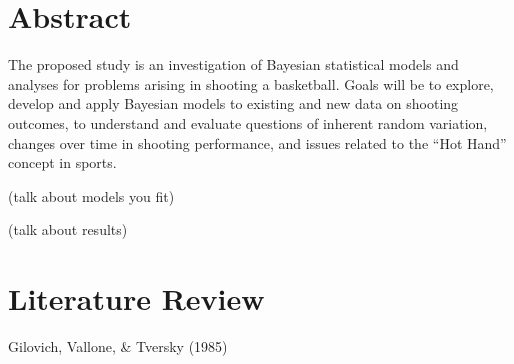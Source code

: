 \documentclass[12pt,twoside]{dukestatscithesis}
\theoremstyle{definition}
\theoremstyle{definition}
\theoremstyle{definition}
\theoremstyle{remark}
\begin{document}
\chapter{Abstract}\label{abstract}

The proposed study is an investigation of Bayesian statistical models
and analyses for problems arising in shooting a basketball. Goals will
be to explore, develop and apply Bayesian models to existing and new
data on shooting outcomes, to understand and evaluate questions of
inherent random variation, changes over time in shooting performance,
and issues related to the ``Hot Hand'' concept in sports.

\par

(talk about models you fit)

\par

(talk about results)

\chapter{Literature Review}\label{litreview}

Gilovich, Vallone, \& Tversky (1985)
\end{document}
